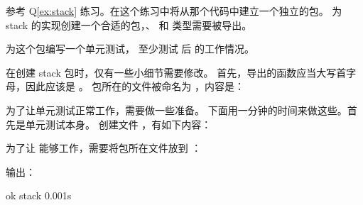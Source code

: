 \begin{Exercise}[title={stack 包},difficulty=0]
\label{ex:stack-package}
\Question\label{ex:stack-package q1} 
参考 Q\ref{ex:stack} 练习。在这个练习中将从那个代码中建立一个独立的包。
为 stack 的实现创建一个合适的包，、 和  类型需要被导出。

\Question\label{ex:stack-package q2} 为这个包编写一个单元测试，
至少测试  后  的工作情况。

\end{Exercise}

\begin{Answer}
\Question 在创建 stack 包时，仅有一些小细节需要修改。
首先，导出的函数应当大写首字母，因此应该是 。
包所在的文件被命名为 ，内容是：


\Question 为了让单元测试正常工作，需要做一些准备。
下面用一分钟的时间来做这些。首先是单元测试本身。
创建文件 ，有如下内容：

为了让  能够工作，需要将包所在文件放到 
：\\

\begin{display}
\pr {}
\pr {}
\pr {}
\end{display}

输出：\\

\begin{display}
\pr {}
ok      stack   0.001s
\end{display}
\end{Answer}
